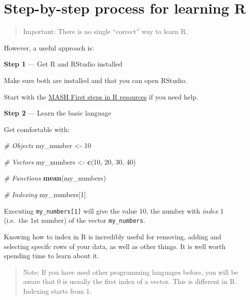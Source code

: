 \documentclass[
]{book}
\newenvironment{Shaded}{\begin{snugshade}}{\end{snugshade}}
\newcommand{\CommentTok}[1]{\textcolor[rgb]{0.56,0.35,0.01}{\textit{#1}}}
\newcommand{\DecValTok}[1]{\textcolor[rgb]{0.00,0.00,0.81}{#1}}
\newcommand{\FunctionTok}[1]{\textcolor[rgb]{0.13,0.29,0.53}{\textbf{#1}}}
\newcommand{\NormalTok}[1]{#1}
\newcommand{\OtherTok}[1]{\textcolor[rgb]{0.56,0.35,0.01}{#1}}
\begin{document}
\section{Step-by-step process for learning R}\label{step-by-step-process-for-learning-r}

\begin{quote}
Important: There is no single ``correct'' way to learn R.
\end{quote}

However, a useful approach is:

\textbf{Step 1} --- Get R and RStudio installed

Make sure both are installed and that you can open RStudio.

Start with the \href{https://sheffield.ac.uk/mash/stats-resources/r\#First-steps}{MASH First steps in R resources} if you need help.

\textbf{Step 2} --- Learn the basic language

Get comfortable with:

\begin{Shaded}
\begin{Highlighting}[]
\CommentTok{\# Objects}
\NormalTok{my\_number }\OtherTok{\textless{}{-}} \DecValTok{10}

\CommentTok{\# Vectors}
\NormalTok{my\_numbers }\OtherTok{\textless{}{-}} \FunctionTok{c}\NormalTok{(}\DecValTok{10}\NormalTok{, }\DecValTok{20}\NormalTok{, }\DecValTok{30}\NormalTok{, }\DecValTok{40}\NormalTok{)}

\CommentTok{\# Functions}
\FunctionTok{mean}\NormalTok{(my\_numbers)}

\CommentTok{\# Indexing}
\NormalTok{my\_numbers[}\DecValTok{1}\NormalTok{]}
\end{Highlighting}
\end{Shaded}

Executing \texttt{my\_numbers{[}1{]}} will give the value 10, the number with \emph{index} 1 (i.e.~the 1st number) of the vector \texttt{my\_numbers}.

Knowing how to index in R is incredibly useful for removing, adding and selecting specifc rows of your data, as well as other things. It is well worth spending time to learn about it.

\begin{quote}
Note: If you have used other programming languages before, you will be aware that 0 is usually the first index of a vector. This is different in R. Indexing starts from 1.
\end{quote}
\end{document}
